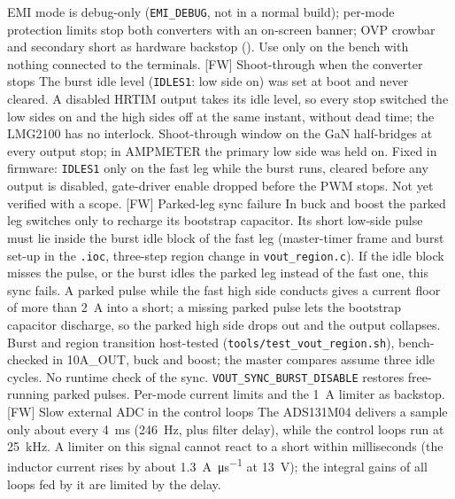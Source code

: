 \begin{FMEATable}
        {EMI mode is debug-only (\texttt{EMI\_DEBUG}, not in a normal build); per-mode protection limits stop both converters with an on-screen banner; \ac{OVP} crowbar and secondary short as hardware backstop (). Use only on the bench with nothing connected to the terminals.}
    \FMEAItemModerate
        {[FW] Shoot-through when the converter stops}
        {The burst idle level (\texttt{IDLES1}: low side on) was set at boot and never cleared. A disabled \ac{HRTIM} output takes its idle level, so every stop switched the low sides on and the high sides off at the same instant, without dead time; the LMG2100 has no interlock.}
        {Shoot-through window on the \ac{GaN} half-bridges at every output stop; in AMPMETER the primary low side was held on.}
        {Fixed in firmware: \texttt{IDLES1} only on the fast leg while the burst runs, cleared before any output is disabled, gate-driver enable dropped before the \ac{PWM} stops. Not yet verified with a scope. }
    \FMEAItemModerate
        {[FW] Parked-leg sync failure}
        {In buck and boost the parked leg switches only to recharge its bootstrap capacitor. Its short low-side pulse must lie inside the burst idle block of the fast leg (master-timer frame and burst set-up in the \texttt{.ioc}, three-step region change in \texttt{vout\_region.c}). If the idle block misses the pulse, or the burst idles the parked leg instead of the fast one, this sync fails.}
        {A parked pulse while the fast high side conducts gives a current floor of more than \qty{2}{\ampere} into a short; a missing parked pulse lets the bootstrap capacitor discharge, so the parked high side drops out and the output collapses.}
        {Burst and region transition host-tested (\texttt{tools/test\_vout\_region.sh}), bench-checked in 10A\_OUT, buck and boost; the master compares assume three idle cycles. No runtime check of the sync. \texttt{VOUT\_SYNC\_BURST\_DISABLE} restores free-running parked pulses. Per-mode current limits and the \qty{1}{\ampere} limiter as backstop. }
    \FMEAItemModerate
        {[FW] Slow external \acs{ADC} in the control loops}
        {The ADS131M04 delivers a sample only about every \qty{4}{\milli\second} (\qty{246}{\hertz}, plus filter delay), while the control loops run at \qty{25}{\kilo\hertz}.}
        {A limiter on this signal cannot react to a short within milliseconds (the inductor current rises by about \qty{1.3}{\ampere\per\micro\second} at \qty{13}{\volt}); the integral gains of all loops fed by it are limited by the delay.}

\end{FMEATable}
